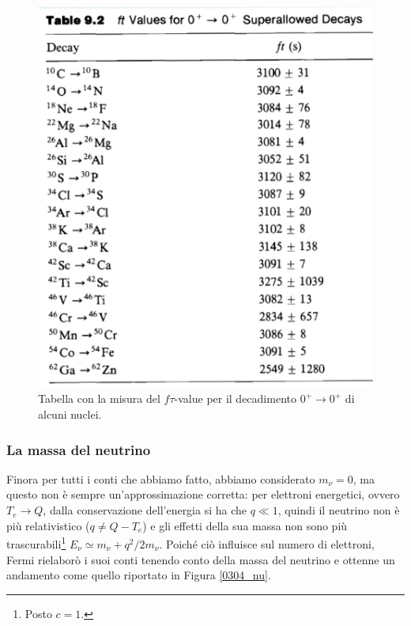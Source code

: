 \begin{figure}
    \centering
    \includegraphics[scale=0.2]{Immagini/0304_dati.png}
    \caption{Tabella con la misura del $f\tau$-value per il decadimento $0^+\to0^+$ di alcuni nuclei.}
    \label{0304_dati2}
\end{figure}

\subsubsection{La massa del neutrino}
Finora per tutti i conti che abbiamo fatto, abbiamo considerato $m_\nu=0$, ma questo non è sempre un'approssimazione corretta: per elettroni energetici, ovvero $T_e\to Q$, dalla conservazione dell'energia si ha che $q\ll 1$, quindi il neutrino non è più relativistico ($q\not = Q-T_e$) e gli effetti della sua massa non sono più trascurabili\footnote{Posto $c=1$.} $E_\nu \simeq m_\nu + q^2/2m_\nu$. Poiché ciò influisce sul numero di elettroni, Fermi rielaborò i suoi conti tenendo conto della massa del neutrino e ottenne un andamento come quello riportato in Figura \ref{0304_nu}.

